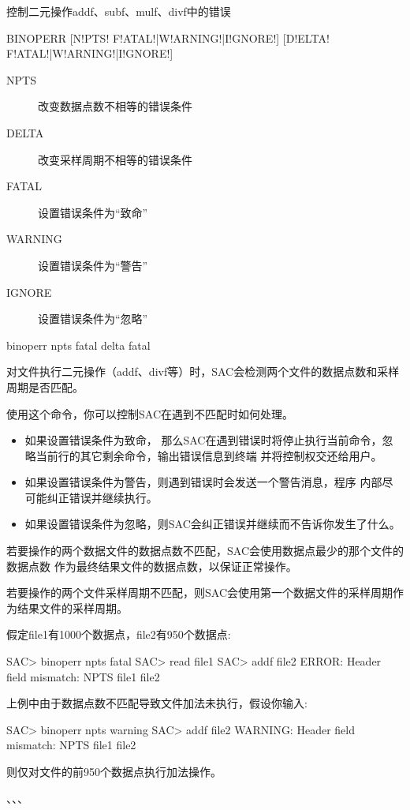 \label{cmd:binoperr}

控制二元操作addf、subf、mulf、divf中的错误

\begin{SACSTX}
BINOPERR [N!PTS! F!ATAL!|W!ARNING!|I!GNORE!] [D!ELTA! F!ATAL!|W!ARNING!|I!GNORE!]
\end{SACSTX}

\begin{description}
\item [NPTS]  改变数据点数不相等的错误条件
\item [DELTA] 改变采样周期不相等的错误条件
\item [FATAL] 设置错误条件为``致命''
\item [WARNING] 设置错误条件为``警告''
\item [IGNORE]  设置错误条件为``忽略''
\end{description}

\begin{SACDFT}
binoperr npts fatal delta fatal
\end{SACDFT}

对文件执行二元操作（addf、divf等）时，SAC会检测两个文件的数据点数和采样周期是否匹配。

使用这个命令，你可以控制SAC在遇到不匹配时如何处理。
\begin{itemize}
\item 如果设置错误条件为致命，
那么SAC在遇到错误时将停止执行当前命令，忽略当前行的其它剩余命令，输出错误信息到终端
并将控制权交还给用户。
\item 如果设置错误条件为警告，则遇到错误时会发送一个警告消息，程序
内部尽可能纠正错误并继续执行。
\item 如果设置错误条件为忽略，则SAC会纠正错误并继续而不告诉你发生了什么。
\end{itemize}

若要操作的两个数据文件的数据点数不匹配，SAC会使用数据点最少的那个文件的数据点数
作为最终结果文件的数据点数，以保证正常操作。

若要操作的两个文件采样周期不匹配，则SAC会使用第一个数据文件的采样周期作为结果文件的采样周期。

假定file1有1000个数据点，file2有950个数据点:
\begin{SACCode}
SAC> binoperr npts fatal
SAC> read file1
SAC> addf file2
ERROR:  Header field mismatch: NPTS file1 file2
\end{SACCode}

上例中由于数据点数不匹配导致文件加法未执行，假设你输入:
\begin{SACCode}
SAC> binoperr npts warning
SAC> addf file2
WARNING:  Header field mismatch: NPTS file1 file2
\end{SACCode}
则仅对文件的前950个数据点执行加法操作。

、、、

